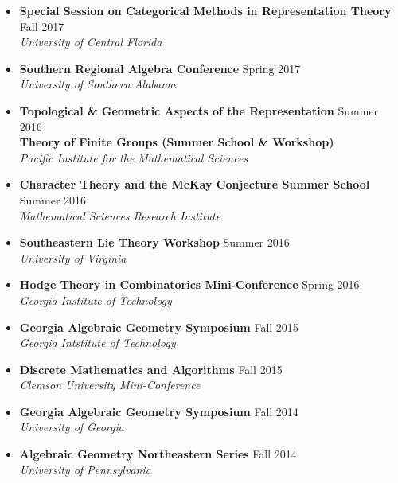 \documentclass[letterpaper,11pt]{article}
\begin{document}
\begin{itemize}
    \item \textbf{Special Session on Categorical Methods in Representation Theory} \hfill Fall 2017 \\
          \textit{University of Central Florida}
    \item \textbf{Southern Regional Algebra Conference} \hfill Spring 2017 \\
          \textit{University of Southern Alabama}  
    \item \textbf{Topological \& Geometric Aspects of the Representation} \hfill Summer 2016 \\
          \textbf{Theory of Finite Groups (Summer School \& Workshop)}  \\
          \textit{Pacific Institute for the Mathematical Sciences}
    \item \textbf{Character Theory and the McKay Conjecture Summer School} \hfill Summer 2016 \\
          \textit{Mathematical Sciences Research Institute}
    \item \textbf{Southeastern Lie Theory Workshop} \hfill Summer 2016 \\
          \textit{University of Virginia}
    \item \textbf{Hodge Theory in Combinatorics Mini-Conference} \hfill Spring 2016 \\
          \textit{Georgia Institute of Technology}
    \item \textbf{Georgia Algebraic Geometry Symposium} \hfill Fall 2015 \\
          \textit{Georgia Intstitute of Technology}
    \item \textbf{Discrete Mathematics and Algorithms} \hfill Fall 2015 \\
          \textit{Clemson University Mini-Conference}
    \item \textbf{Georgia Algebraic Geometry Symposium} \hfill Fall 2014 \\
          \textit{University of Georgia}
    \item \textbf{Algebraic Geometry Northeastern Series} \hfill Fall 2014 \\
          \textit{University of Pennsylvania}
\end{itemize}
\end{document}
